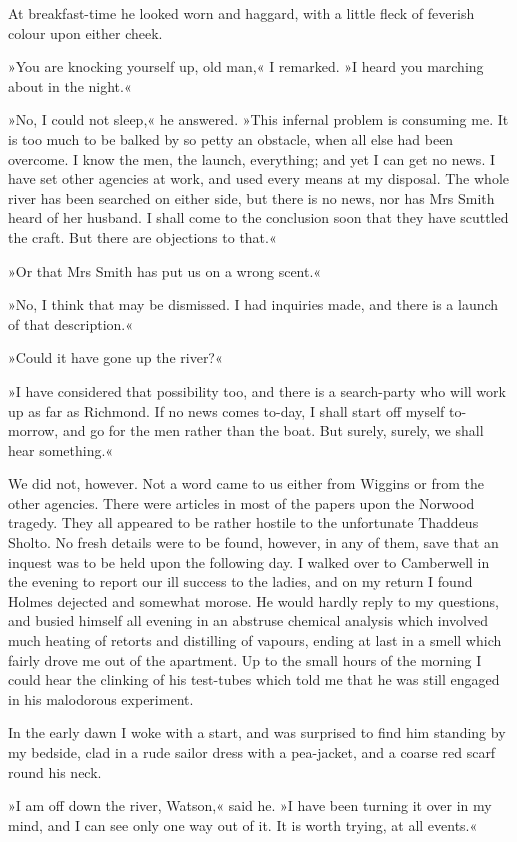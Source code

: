 At breakfast-time he looked worn and haggard, with a little fleck of feverish colour upon either cheek.

»You are knocking yourself up, old man,« I remarked. »I heard you marching about in the night.«

»No, I could not sleep,« he answered. »This infernal problem is consuming me. It is too much to be balked by so petty an obstacle, when all else had been overcome. I know the men, the launch, everything; and yet I can get no news. I have set other agencies at work, and used every means at my disposal. The whole river has been searched on either side, but there is no news, nor has Mrs Smith heard of her husband. I shall come to the conclusion soon that they have scuttled the craft. But there are objections to that.«

»Or that Mrs Smith has put us on a wrong scent.«

»No, I think that may be dismissed. I had inquiries made, and there is a launch of that description.«

»Could it have gone up the river?«

»I have considered that possibility too, and there is a search-party who will work up as far as Richmond. If no news comes to-day, I shall start off myself to-morrow, and go for the men rather than the boat. But surely, surely, we shall hear something.«

We did not, however. Not a word came to us either from Wiggins or from the other agencies. There were articles in most of the papers upon the Norwood tragedy. They all appeared to be rather hostile to the unfortunate Thaddeus Sholto. No fresh details were to be found, however, in any of them, save that an inquest was to be held upon the following day. I walked over to Camberwell in the evening to report our ill success to the ladies, and on my return I found Holmes dejected and somewhat morose. He would hardly reply to my questions, and busied himself all evening in an abstruse chemical analysis which involved much heating of retorts and distilling of vapours, ending at last in a smell which fairly drove me out of the apartment. Up to the small hours of the morning I could hear the clinking of his test-tubes which told me that he was still engaged in his malodorous experiment.

In the early dawn I woke with a start, and was surprised to find him standing by my bedside, clad in a rude sailor dress with a pea-jacket, and a coarse red scarf round his neck.

»I am off down the river, Watson,« said he. »I have been turning it over in my mind, and I can see only one way out of it. It is worth trying, at all events.«

